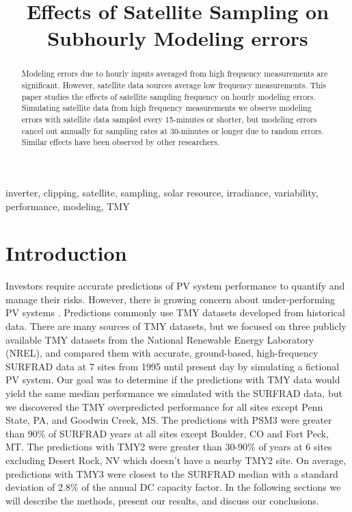 \documentclass[conference]{IEEEtran}
\begin{document}
\title{Effects of Satellite Sampling on Subhourly Modeling errors}

\author{
}

\maketitle

\begin{abstract}
Modeling errors due to hourly inputs averaged from high frequency measurements are significant. However, satellite data sources average low frequency measurements. This paper studies the effects of satellite sampling frequency on hourly modeling errors. Simulating satellite data from high frequency measurements we observe modeling errors with satellite data sampled every 15-minutes or shorter, but modeling errors cancel out annually for sampling rates at 30-minutes or longer due to random errors. Similar effects have been observed by other researchers.
\end{abstract}

\begin{IEEEkeywords}
inverter, clipping, satellite, sampling, solar resource, irradiance, variability, performance, modeling, TMY
\end{IEEEkeywords}

\section{Introduction}
Investors require accurate predictions of PV system performance to quantify and manage their risks. However, there is growing concern about under-performing PV systems \cite{Matsui2020}. Predictions commonly use TMY datasets developed from historical data. There are many sources of TMY datasets, but we focused on three publicly available TMY datasets from the National Renewable Energy Laboratory (NREL), and compared them with accurate, ground-based, high-frequency SURFRAD data at 7 sites from 1995 until present day \cite{Augustine2000} by simulating a fictional PV system. Our goal was to determine if the predictions with TMY data would yield the same median performance we simulated with the SURFRAD data, but we discovered the TMY overpredicted performance for all sites except Penn State, PA, and Goodwin Creek, MS. The predictions with PSM3 were greater than 90\% of SURFRAD years at all sites except Boulder, CO and Fort Peck, MT. The predictions with TMY2 were greater than 30-90\% of years at 6 sites excluding Desert Rock, NV which doesn't have a nearby TMY2 site. On average, predictions with TMY3 were closest to the SURFRAD median with a standard deviation of 2.8\% of the annual DC capacity factor. In the following sections we will describe the methods, present our results, and discuss our conclusions.
\end{document}

